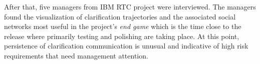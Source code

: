 
After that, five managers from IBM RTC project were interviewed. %
The managers found the visualization of clarification trajectories and the associated social networks most useful in the project's \emph{end game} which is the time close to the release where primarily testing and polishing are taking place. 
At this point, persistence of  clarification communication is unusual and indicative of high risk requirements that need management attention.
